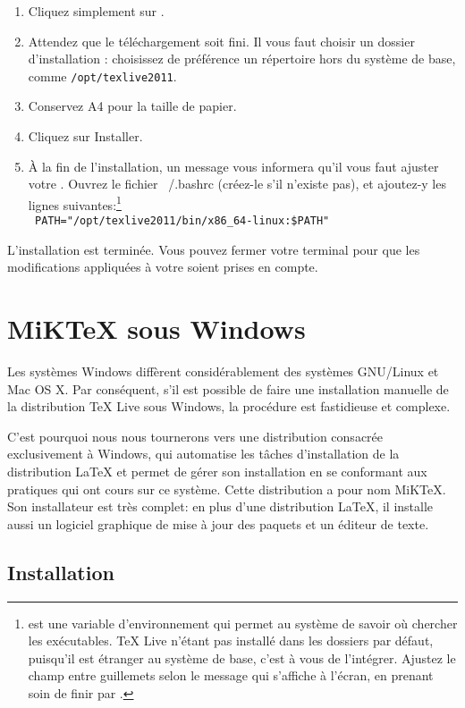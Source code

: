 \begin{enumerate}
\item Cliquez simplement sur .
\item Attendez que le téléchargement soit fini. Il vous faut choisir un dossier d'installation : choisissez de préférence un répertoire hors du système de base, comme \verb|/opt/texlive2011|.
\item Conservez A4 pour la taille de papier.
\item Cliquez sur Installer.
\item À la fin de l'installation, un message vous informera qu'il vous faut ajuster votre . Ouvrez le fichier ~/.bashrc (créez-le s'il n'existe pas), et ajoutez-y les lignes suivantes:\footnote{ est une variable d'environnement qui permet au système de savoir où chercher les exécutables. TeX Live n'étant pas installé dans les dossiers par défaut, puisqu'il est   étranger au système de base, c'est à vous de l'intégrer. Ajustez le champ entre guillemets selon le message qui s'affiche à l'écran, en prenant soin de finir par  .}\\
\verb| PATH="/opt/texlive2011/bin/x86_64-linux:$PATH"|
\end{enumerate}

L'installation est terminée. Vous pouvez fermer votre terminal pour que les modifications appliquées à votre  soient prises en compte. 


\section{MiKTeX sous Windows}


Les systèmes Windows diffèrent considérablement des systèmes GNU/Linux et Mac OS X. Par conséquent, s'il est possible de faire une installation manuelle de la distribution TeX Live sous Windows, la procédure est fastidieuse et complexe.

C'est pourquoi nous nous tournerons vers une distribution consacrée exclusivement à Windows, qui automatise les tâches d'installation de la distribution \LaTeX{} et permet de gérer son installation en se conformant aux pratiques qui ont cours sur ce système. Cette distribution a pour nom MiKTeX. Son installateur est très complet: en plus d'une distribution \LaTeX{}, il installe aussi un logiciel graphique de mise à jour des paquets et un éditeur de texte.

\subsection{Installation}

